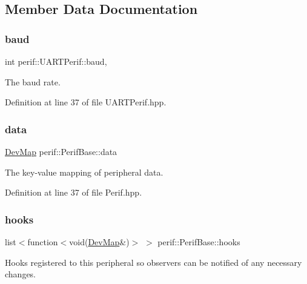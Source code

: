 \subsection{Member Data Documentation}
\mbox{\label{classperif_1_1UARTPerif_a8d5c1c0ce1f1758392dc0145f0caade8}} 
\subsubsection{\texorpdfstring{baud}{baud}}
{\footnotesize\ttfamily int perif\+::\+U\+A\+R\+T\+Perif\+::baud\hspace{0.3cm}{\ttfamily [protected]}, {\ttfamily [inherited]}}

The baud rate. 

Definition at line 37 of file U\+A\+R\+T\+Perif.\+hpp.

\mbox{\label{classperif_1_1PerifBase_a1a3afaa535fda17e9f97123fffe78765}} 
\subsubsection{\texorpdfstring{data}{data}}
{\footnotesize\ttfamily \mbox{\hyperlink{Perif_8hpp_a358ff4ee6d24694ee7661f0cce14377e}{Dev\+Map}} perif\+::\+Perif\+Base\+::data\hspace{0.3cm}{\ttfamily [inherited]}}

The key-\/value mapping of peripheral data. 

Definition at line 37 of file Perif.\+hpp.

\mbox{\label{classperif_1_1PerifBase_a98964e5ca8384df64881265e0aa6d7b6}} 
\subsubsection{\texorpdfstring{hooks}{hooks}}
{\footnotesize\ttfamily list$<$function$<$void(\mbox{\hyperlink{Perif_8hpp_a358ff4ee6d24694ee7661f0cce14377e}{Dev\+Map}}\&)$>$ $>$ perif\+::\+Perif\+Base\+::hooks\hspace{0.3cm}{\ttfamily [inherited]}}

Hooks registered to this peripheral so observers can be notified of any necessary changes. 

